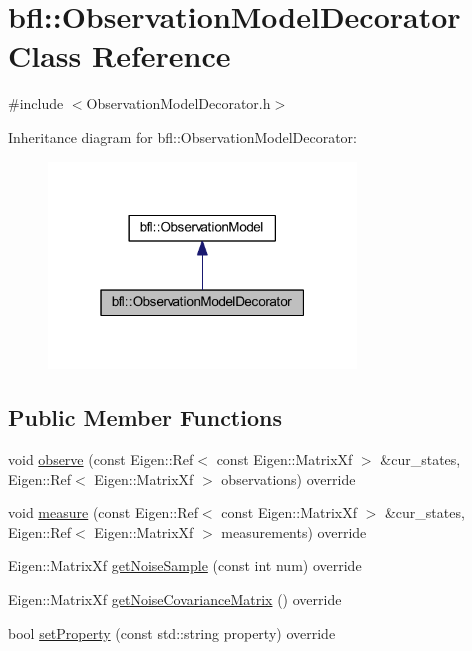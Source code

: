 \hypertarget{classbfl_1_1ObservationModelDecorator}{}\section{bfl\+:\+:Observation\+Model\+Decorator Class Reference}
\label{classbfl_1_1ObservationModelDecorator}


{\ttfamily \#include $<$Observation\+Model\+Decorator.\+h$>$}



Inheritance diagram for bfl\+:\+:Observation\+Model\+Decorator\+:
\nopagebreak
\begin{figure}[H]
\begin{center}
\leavevmode
\includegraphics[width=232pt]{classbfl_1_1ObservationModelDecorator__inherit__graph}
\end{center}
\end{figure}
\subsection*{Public Member Functions}
\begin{DoxyCompactItemize}
\item 
void \mbox{\hyperlink{classbfl_1_1ObservationModelDecorator_aa2b83722ba591ab268def7a39e4e16b0}{observe}} (const Eigen\+::\+Ref$<$ const Eigen\+::\+Matrix\+Xf $>$ \&cur\+\_\+states, Eigen\+::\+Ref$<$ Eigen\+::\+Matrix\+Xf $>$ observations) override
\item 
void \mbox{\hyperlink{classbfl_1_1ObservationModelDecorator_a6b0da9bcfe0fd1beb119c79f83f8cc9a}{measure}} (const Eigen\+::\+Ref$<$ const Eigen\+::\+Matrix\+Xf $>$ \&cur\+\_\+states, Eigen\+::\+Ref$<$ Eigen\+::\+Matrix\+Xf $>$ measurements) override
\item 
Eigen\+::\+Matrix\+Xf \mbox{\hyperlink{classbfl_1_1ObservationModelDecorator_a3e8cecfbd2402944d1f9e4682d5fd9a0}{get\+Noise\+Sample}} (const int num) override
\item 
Eigen\+::\+Matrix\+Xf \mbox{\hyperlink{classbfl_1_1ObservationModelDecorator_a60faf028d6c83e02cf0a88c58064abf2}{get\+Noise\+Covariance\+Matrix}} () override
\item 
bool \mbox{\hyperlink{classbfl_1_1ObservationModelDecorator_a0d6ab787754a56159e3d1bc6d56a961c}{set\+Property}} (const std\+::string property) override
\end{DoxyCompactItemize}
